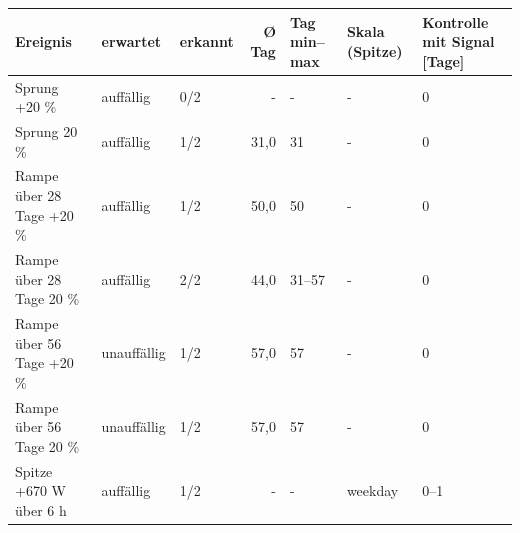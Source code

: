 \begin{tabular}{lllrlll}
\toprule
Ereignis & erwartet & erkannt & Ø Tag & Tag min–max & Skala (Spitze) & Kontrolle mit Signal [Tage] \\
\midrule
Sprung +20 \% & auffällig & 0/2 & - & - & - & 0 \\
Sprung \textminus{}20 \% & auffällig & 1/2 & 31,0 & 31 & - & 0 \\
Rampe über 28 Tage +20 \% & auffällig & 1/2 & 50,0 & 50 & - & 0 \\
Rampe über 28 Tage \textminus{}20 \% & auffällig & 2/2 & 44,0 & 31–57 & - & 0 \\
Rampe über 56 Tage +20 \% & unauffällig & 1/2 & 57,0 & 57 & - & 0 \\
Rampe über 56 Tage \textminus{}20 \% & unauffällig & 1/2 & 57,0 & 57 & - & 0 \\
Spitze +670 W über 6 h & auffällig & 1/2 & - & - & weekday & 0–1 \\
\bottomrule
\end{tabular}
